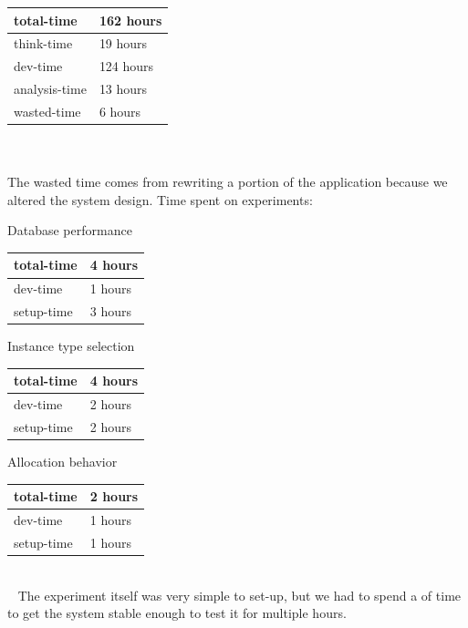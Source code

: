 \documentclass[a4paper]{IEEEtran}
\begin{document}
\newline
\begin{tabular}{| l | l |}
\hline
total-time & 162 hours \\ \hline
think-time & 19 hours \\ \hline
dev-time & 124 hours \\ \hline
analysis-time & 13 hours \\ \hline
wasted-time & 6 hours \\ \hline
\end{tabular}
\\\ 
\\
The wasted time comes from rewriting a portion of the application because we altered the system design.
\newline
\newline
Time spent on experiments:
\newline
\begin{LaTeXdescription}
\item[Database performance] \ \\
\newline
\begin{tabular}{| l | l |}
\hline
total-time & 4 hours \\ \hline
dev-time & 1 hours \\ \hline
setup-time & 3 hours \\ \hline
\end{tabular}
\item[Instance type selection] \ \\
\newline
\begin{tabular}{| l | l |}
\hline
total-time & 4 hours \\ \hline
dev-time & 2 hours \\ \hline
setup-time & 2 hours \\ \hline
\end{tabular}
\newline
\newline
\item[Allocation behavior] \ \\
\newline
\begin{tabular}{| l | l |}
\hline
total-time & 2 hours \\ \hline
dev-time & 1 hours \\ \hline
setup-time & 1 hours \\ \hline
\end{tabular}
\\\ 
\newline
The experiment itself was very simple to set-up, but we had to spend a of time to get the system stable enough to test it for multiple hours.
\end{LaTeXdescription}
\end{document}

